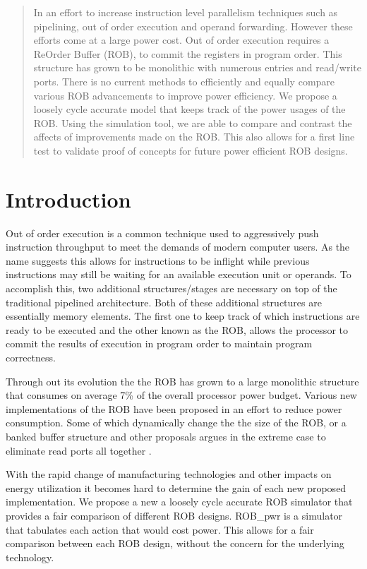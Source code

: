 \begin{abstract}
        In an effort to increase instruction level parallelism techniques such
as pipelining, out of order execution and operand forwarding.  However
these efforts come at a large power cost.  Out of order execution requires
a ReOrder Buffer (ROB), to commit the registers in program order.  This
structure has grown to be monolithic with numerous entries and read/write ports.
There is no current methods to efficiently and equally compare various
ROB advancements to improve power efficiency. We propose a loosely cycle
accurate model that keeps track of the power usages of the ROB.  Using the 
simulation tool, we are able to compare and contrast the affects of improvements
made on the ROB.  This also allows for a first line test to validate proof of
concepts for future power efficient ROB designs.
\end{abstract}



\section{Introduction}
Out of order execution is a common technique used to aggressively push instruction
throughput to meet the demands of modern computer users.  As the name suggests
this allows for instructions to be inflight while previous instructions may still be waiting 
for an available execution unit or operands.  To accomplish this, two additional structures/stages
are necessary  on top of the traditional pipelined architecture.  Both of these additional
structures are essentially memory elements. The first one to keep track of which instructions
are ready to be executed and the other known as the ROB, allows the processor  to commit the
results of execution in program order to maintain program correctness.  

Through out its evolution the the ROB has grown to a large monolithic structure that consumes
on average 7\% of the overall processor power budget\cite{rabey}.  Various new implementations
of the ROB have been proposed in an effort to reduce power consumption.  Some of which 
dynamically change the the size of the ROB, or a banked buffer structure and other proposals argues in the 
extreme case to eliminate read ports all together\cite{kucuk}\cite{kucuk2} \cite{kucuk3}.

With the rapid change of manufacturing technologies and other impacts on energy utilization it 
becomes hard to determine the gain of each new proposed implementation.  We propose a new
a loosely cycle accurate ROB simulator that provides a fair comparison of  different ROB designs.
ROB\_pwr is a simulator that tabulates each action that would cost power.  This allows for a fair
comparison between each ROB design, without the concern for the underlying technology. 